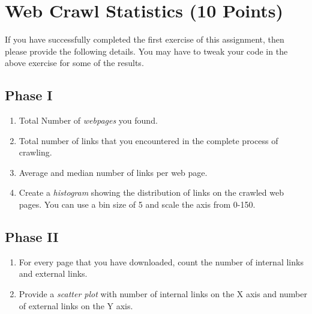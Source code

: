 \documentclass{WeSTassignment}
\begin{document}

\section{Web Crawl Statistics (10 Points)}

If you have successfully completed the first exercise of this assignment, then please provide the following details. You may have to tweak your code in the above exercise for some of the results. 
\subsection{Phase I}
\begin{enumerate}
\item Total Number of \emph{webpages} you found.
\item Total number of links that you encountered in the complete process of crawling.
\item Average and median number of links per web page.
\item Create a \emph{histogram} showing the distribution of links on the crawled web pages. You can use a bin size of 5 and scale the axis from 0-150.
\end{enumerate}

\subsection{Phase II}
\begin{enumerate}
\item For every page that you have downloaded, count the number of internal links and external links. 
\item Provide a \emph{scatter plot} with number of internal links on the X axis and number of external links on the Y axis.
\end{enumerate}
\end{document}
